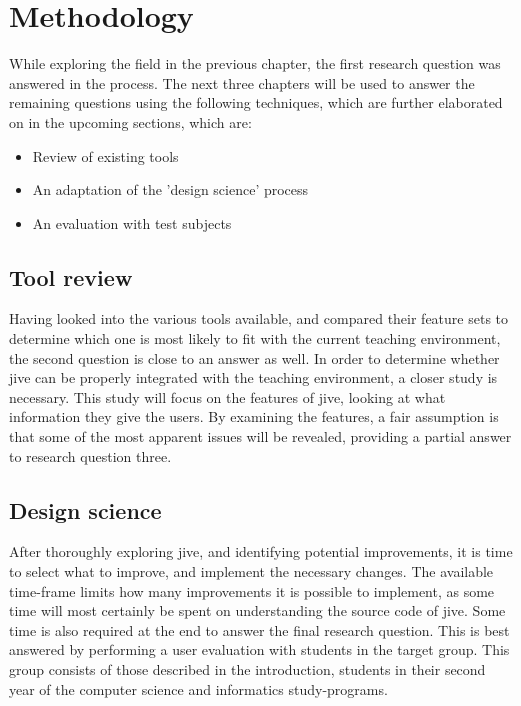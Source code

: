 \chapter{Methodology}\label{methodology}

While exploring the field in the previous chapter, the first research question was answered in the process.
The next three chapters will be used to answer the remaining questions using the following techniques, which are further elaborated on in the upcoming sections, which are:

\begin{itemize}
	\item{Review of existing tools}
	\item{An adaptation of the 'design science' process}%
	\item{An evaluation with test subjects}
\end{itemize}

\section{Tool review}\label{methReview}

Having looked into the various tools available, and compared their feature sets to determine which one is most likely to fit with the current teaching environment, the second question is close to an answer as well.
In order to determine whether \gls{jive} can be properly integrated with the teaching environment, a closer study is necessary.
This study will focus on the features of \gls{jive}, looking at what information they give the users.
By examining the features, a fair assumption is that some of the most apparent issues will be revealed, providing a partial answer to research question three.

\section{Design science}\label{methDesign}



After thoroughly exploring \gls{jive}, and identifying potential improvements, it is time to select what to improve, and implement the necessary changes.
The available time-frame limits how many improvements it is possible to implement, as some time will most certainly be spent on understanding the source code of \gls{jive}.
Some time is also required at the end to answer the final research question.
This is best answered by performing a user evaluation with students in the target group.
This group consists of those described in the introduction, students in their second year of the computer science and informatics study-programs.

